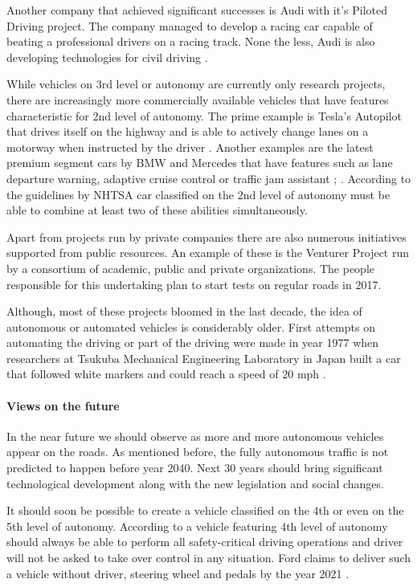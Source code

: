 \documentclass[11pt,english]{article}
\begin{document}
\par
Another company that achieved significant successes is Audi with it's Piloted Driving project. The company managed to develop a racing car capable of beating a professional drivers on a racing track. None the less, Audi is also developing technologies for civil driving \citep{audi1}.

\par


While vehicles on 3rd level or autonomy are currently only research projects, there are increasingly more commercially available vehicles that have features characteristic for 2nd level of autonomy. The prime example is Tesla's Autopilot that drives itself on the highway and is able to actively change lanes on a motorway when instructed by the driver \citep{tesla2}. Another examples are the latest premium segment cars by BMW and Mercedes that have features such as lane departure warning, adaptive cruise control or traffic jam assistant \citep{bmw}; \citep{mercedes1}. According to the guidelines by NHTSA car classified on the 2nd level of autonomy must be able to combine at least two of these abilities simultaneously.


\par

Apart from projects run by private companies there are also numerous initiatives supported from public resources. An example of these is the Venturer Project run by a consortium of academic, public and private  organizations. The people responsible for this undertaking plan to start tests on regular roads in 2017.

\par
Although, most of these projects bloomed in the last decade, the idea of autonomous or automated vehicles is considerably older. First attempts on automating the driving or part of the driving were made in year 1977 when researchers at Tsukuba Mechanical Engineering Laboratory in Japan built a car that followed white markers and could reach a speed of 20 mph \citep{forrest2007autonomous}.





\paragraph{Views on the future}
\par
In the near future we should observe as more and more autonomous vehicles appear on the roads. As mentioned before, the fully autonomous traffic is not predicted to happen before year 2040. Next 30 years should bring significant technological development along with the new legislation and social changes.
\par
It should soon be possible to create a vehicle classified on the 4th or even on the 5th level of autonomy. According to \citet{nhtsa1} a vehicle featuring 4th level of autonomy should always be able to perform all safety-critical driving operations and driver will not be asked to take over control in any situation. Ford claims to deliver such a vehicle without driver, steering wheel and pedals by the year 2021 \citep{ford1}.
\end{document}
